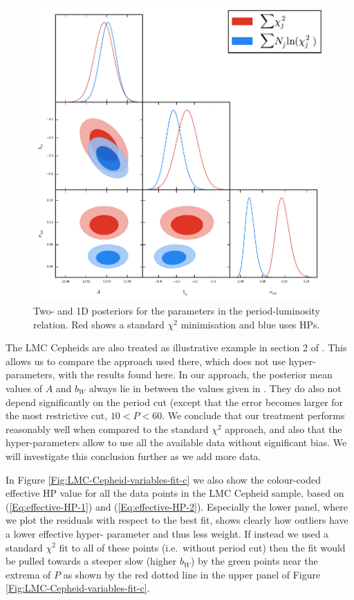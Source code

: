 \begin{figure}[hbtp]
\centering
\includegraphics[width=\textwidth]{figures/chapter-h0/triangle_figure_joint_sigma_int.pdf}
\caption{Two- and 1D posteriors for the parameters in the period-luminosity relation. Red shows a standard $\chi^2$ minimisation and blue uses HPs.  }
\label{fig:sigmaint}
\end{figure}

The LMC Cepheids are also treated as illustrative example in section 2 of \cite{Efstathiou:2013via}. This allows us to compare the approach used there, which does not use hyper-parameters, with the results found here. In our approach, the posterior mean values of $A$ and $b_W$ always lie in between the values given in \cite{Efstathiou:2013via}. They do also not depend significantly on the period cut (except that the error becomes larger for the most restrictive cut, $10<P<60$. We conclude that our treatment performs reasonably well when compared to the standard $\chi^2$ approach, and also that the hyper-parameters allow to use all the available data without significant bias. We will investigate this conclusion further as we add more data.

In Figure \ref{Fig:LMC-Cepheid-variables-fit-c} we also show the colour-coded effective HP value for all the data points in the LMC Cepheid sample, based on (\ref{Eq:effective-HP-1}) and (\ref{Eq:effective-HP-2}). Especially the lower panel, where we plot the residuals with respect to the best fit, shows clearly how outliers have a lower effective hyper- parameter and thus less weight. If instead we used a standard $\chi^2$ fit to all of these points (i.e.\ without period cut) then the fit would be pulled towards a steeper slow (higher $b_W$) by the green points near the extrema of $P$ as shown by the red dotted line in the upper panel of Figure \ref{Fig:LMC-Cepheid-variables-fit-c}. 

